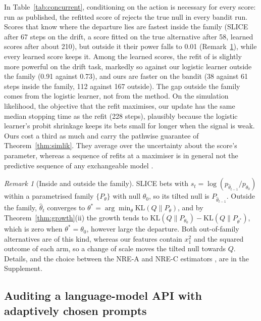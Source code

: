 \documentclass[12pt]{article}
\newcommand{\KL}{\mathrm{KL}}
\theoremstyle{remark}
\newtheorem{remark}{Remark}
\begin{document}
In Table~\ref{tab:concurrent}, conditioning on the action is necessary for
every score: run as published, the refitted score of
\citet{forre2026anytime} rejects the true null in every bandit run. Scores that know where the departure lies are fastest inside the family (SLICE after 67 steps on the drift, a score fitted on the true alternative after 58, learned scores after about 210), but outside it their power falls to 0.01 (Remark~\ref{rem:family}), while every learned score keeps it. Among the learned
scores, the refit of \citet{forre2026anytime} is slightly more powerful on the
drift task, markedly so against our logistic learner outside the family (0.91
against 0.73), and ours are faster on the bandit (38 against 61 steps inside
the family, 112 against 167 outside). The gap outside the family comes from
the logistic learner, not from the method. On the simulation likelihood, the
objective that the refit maximises, our update has the same median stopping
time as the refit (228 steps), plausibly because the logistic learner's probit
shrinkage keeps its bets small for longer when the signal is weak. Ours cost a
third as much and carry the pathwise guarantee of Theorem~\ref{thm:simlik}.
They average over the uncertainty about the score's parameter, whereas a sequence of refits at a maximiser is in general not the
predictive sequence of any exchangeable model
\citep{fortini2024exchangeability}.

\begin{remark}[Inside and outside the family]\label{rem:family}
SLICE bets with $s_t = \log (p_{\hat\theta_{t-1}}/p_{\theta_0})$ within a
parametrised family $\{P_\theta\}$ with null $\theta_0$, so its tilted null is
$P_{\hat\theta_{t-1}}$. Outside the family, $\hat\theta_t$ converges to
$\theta^* = \arg\min_\theta \KL(Q\|P_\theta)$, and by
Theorem~\ref{thm:growth}(ii) the growth tends to
$\KL(Q\|P_{\theta_0}) - \KL(Q\|P_{\theta^*})$, which is zero when
$\theta^* = \theta_0$, however large the departure. Both out-of-family
alternatives are of this kind, whereas our features contain $x_1^2$ and the
squared outcome of each arm, so a change of scale moves the tilted null towards
$Q$. Details, and the choice between the NRE-A and NRE-C estimators
\citep{miller2022contrastive}, are in the Supplement.
\end{remark}

\subsection{Auditing a language-model API with adaptively chosen prompts}\label{sec:exp-llm}
\end{document}
